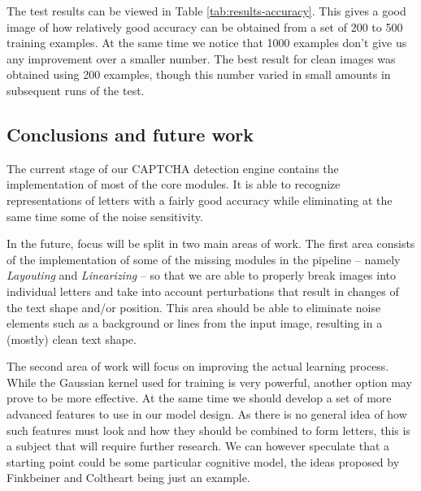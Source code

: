 \documentclass[a4paper,12pt]{article}
\begin{document}
The test results can be viewed in Table \ref{tab:results-accuracy}. This gives
a good image of how relatively good accuracy can be obtained from a set of 200
to 500 training examples. At the same time we notice that 1000 examples don't
give us any improvement over a smaller number. The best result for clean images
was obtained using 200 examples, though this number varied in small amounts in
subsequent runs of the test.

\subsection*{Conclusions and future work}

The current stage of our CAPTCHA detection engine contains the implementation
of most of the core modules. It is able to recognize representations of letters
with a fairly good accuracy while eliminating at the same time some of the
noise sensitivity.

In the future, focus will be split in two main areas of work. The first area
consists of the implementation of some of the missing modules in the
pipeline -- namely \textit{Layouting} and \textit{Linearizing} -- so that we
are able to properly break images into individual letters and take into account
perturbations that result in changes of the text shape and/or position. This
area should be able to eliminate noise elements such as a background or lines
from the input image, resulting in a (mostly) clean text shape.

The second area of work will focus on improving the actual learning process.
While the Gaussian kernel used for training is very powerful, another option
may prove to be more effective. At the same time we should develop a set of
more advanced features to use in our model design. As there is no general idea
of how such features must look and how they should be combined to form letters,
this is a subject that will require further research. We can however speculate
that a starting point could be some particular cognitive model, the ideas
proposed by Finkbeiner and Coltheart\cite{Finkbeiner_Coltheart_2009} being just
an example.

\vskip 0.2in


\end{document}
